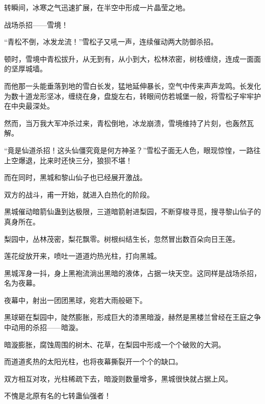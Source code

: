\begin{this_body}
转瞬间，冰寒之气迅速扩展，在半空中形成一片晶莹之地。

战场杀招——雪境！

“青松不倒，冰发龙流！”雪松子又吼一声，连续催动两大防御杀招。

顿时，雪境中青松拔升，从无到有，从小到大，松林浓密，树枝缠绕，连成一面面的坚厚城墙。

而他那一头能垂落到地的雪白长发，猛地延伸暴长，空气中传来声声龙鸣。长发化为数十道龙形坚冰，缠绕在身，盘旋左右，转眼间仿若城堡一般，将雪松子牢牢护在中央最深处。

然而，当万我大军冲杀过来，青松倒地，冰龙崩溃，雪境维持了片刻，也轰然瓦解。

“竟是仙道杀招！这头仙僵究竟是何方神圣？”雪松子面无人色，眼现惊惶，一路往上空爆退，比来时还快三分，狼狈不堪！

而在同时，黑城和黎山仙子也已经展开激战。

双方的战斗，甫一开始，就进入白热化的阶段。

黑城催动暗箭仙蛊到达极限，三道暗箭射进梨园，不断穿梭寻觅，搜寻黎山仙子的真身所在。

梨园中，丛林茂密，梨花飘零。树根纠结生长，忽然冒出数百朵向日王莲。

莲花绽放开来，喷吐一道道灼热光柱，打向黑城。

黑城浑身一抖，身上黑袍流淌出黑暗的液体，占据一块天空。这同样是战场杀招，名为夜幕。

夜幕中，射出一团团黑球，宛若大雨般砸下。

黑球砸在梨园中，陡然膨胀，形成巨大的漆黑暗漩，赫然是黑楼兰曾经在王庭之争中动用的杀招——暗漩。

暗漩膨胀，腐蚀周围的树木、花草，在梨园中形成一个个破败的大洞。

而道道炙热的太阳光柱，也将夜幕撕裂开一个个的缺口。

双方相互对攻，光柱稀疏下去，暗漩则数量增多，黑城很快就占据上风。

不愧是北原有名的七转蛊仙强者！

\end{this_body}

